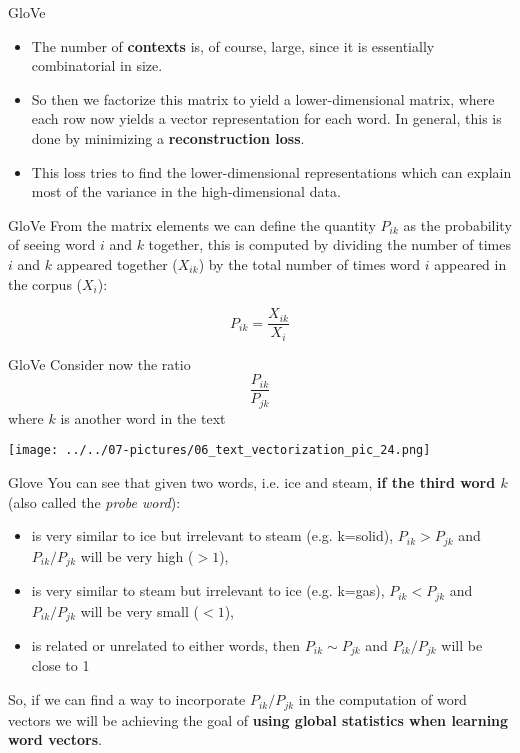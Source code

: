 \documentclass[11pt]{beamer}
\begin{document}
\begin{frame}{GloVe}
	\begin{itemize}
		\item The number of \textbf{contexts} is, of course, large, since it is essentially combinatorial in size. 
		\item So then we factorize this matrix to yield a lower-dimensional matrix, where each row now yields a vector representation for each word. In general, this is done by minimizing a \textbf{reconstruction loss}. 
		\item This loss tries to find the lower-dimensional representations which can explain most of the variance in the high-dimensional data.
	\end{itemize}
\end{frame}
\begin{frame}{GloVe}
	From the matrix elements we can define the quantity $P_{ik}$ as the probability of seeing word $i$ and $k$ together, this is computed by dividing the number of times $i$ and $k$ appeared together ($X_{ik}$) by the total number of times word $i$ appeared in the corpus ($X_i$):
	
\begin{equation}
P_{ik} = \frac{X_{ik}}{X_i}
\end{equation}	 
\end{frame}
\begin{frame}{GloVe}
Consider now the ratio \begin{equation} \frac{P_{ik}}{P_{jk}} \end{equation} where $k$ is another word in the text
	\begin{center}
	\texttt{[image: ../../07-pictures/06\_text\_vectorization\_pic\_24.png]}
	\end{center}
\end{frame}
\begin{frame}{Glove}
You can see that given two words, i.e. ice and steam, \textbf{if the third word $k$} (also called the \textit{probe word}):
	\begin{itemize}
		\item is very similar to ice but irrelevant to steam (e.g. k=solid), $P_{ik} > P_{jk}$ and $P_{ik}/P_{jk}$ will be very high ($>1$),
		\item is very similar to steam but irrelevant to ice (e.g. k=gas), $P_{ik} < P_{jk}$ and $P_{ik}/P_{jk}$ will be very small ($<1$),
		\item is related or unrelated to either words, then $P_{ik} \sim P_{jk}$ and $P_{ik}/P_{jk}$ will be close to 1
	\end{itemize}
So, if we can find a way to incorporate $P_{ik}/P_{jk}$ in the computation of word vectors we will be achieving the goal of \textbf{using global statistics when learning word vectors}.
\end{frame}
\end{document}
